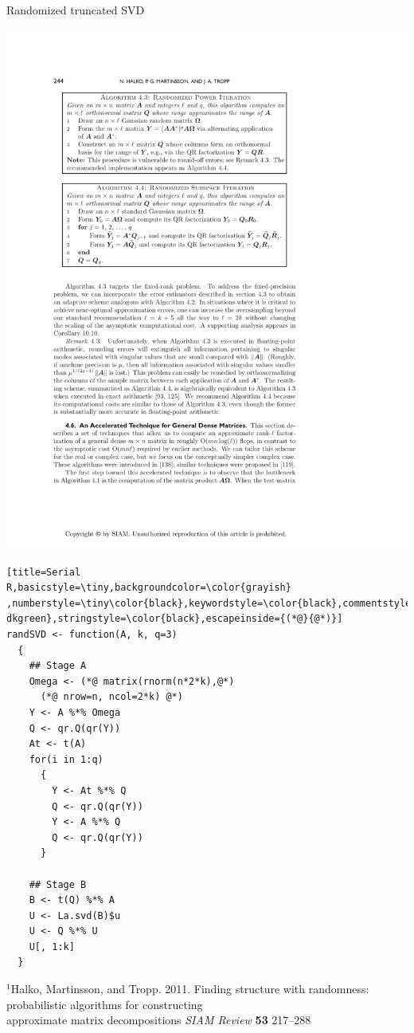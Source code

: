 \begin{frame}[fragile]
\begin{block}{Randomized truncated SVD\footnotemark}
\begin{minipage}{.56\textwidth}
\begin{center}
      \includegraphics[height=.26\textheight]{../common/pics/randsvd/randSVDalg4_4}
    \end{center}
  \end{minipage}
  \begin{minipage}{0.43\textwidth}
\begin{lstlisting}[title=Serial
R,basicstyle=\tiny,backgroundcolor=\color{grayish}
,numberstyle=\tiny\color{black},keywordstyle=\color{black},commentstyle=\color{
dkgreen},stringstyle=\color{black},escapeinside={(*@}{@*)}]
randSVD <- function(A, k, q=3)
  {
    ## Stage A
    Omega <- (*@ matrix(rnorm(n*2*k),@*)
      (*@ nrow=n, ncol=2*k) @*)
    Y <- A %*% Omega
    Q <- qr.Q(qr(Y))
    At <- t(A)
    for(i in 1:q)
      {
        Y <- At %*% Q
        Q <- qr.Q(qr(Y))
        Y <- A %*% Q
        Q <- qr.Q(qr(Y))
      }

    ## Stage B
    B <- t(Q) %*% A
    U <- La.svd(B)$u
    U <- Q %*% U
    U[, 1:k]
  }
\end{lstlisting} %
\end{minipage}
{\fontsize{6pt}{10}\selectfont $^1$Halko, Martinsson,
  and Tropp. 2011. Finding structure with randomness: probabilistic
  algorithms  for constructing \\[-1ex] approximate matrix decompositions
  \emph{SIAM Review} \textbf{53} 217--288}
\end{block}
\end{frame}


